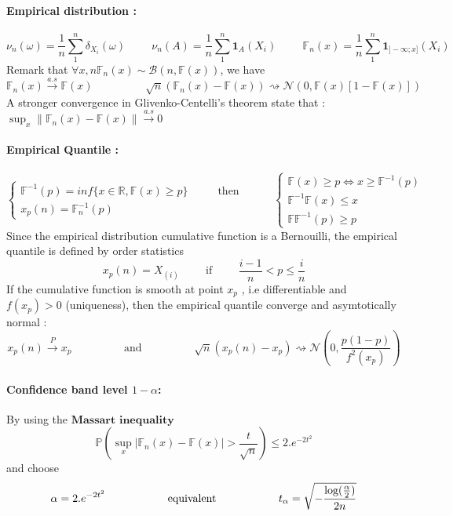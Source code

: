 \documentclass[a4paper,10pt]{article}
\begin{document}
\paragraph{Empirical distribution : }
\[
\nu_n(\omega) = \frac{1}{n}\sum^{n}_{1} \delta_{X_i}(\omega) 
\hspace{1cm} 
\nu_n(A) = \frac{1}{n} \sum^{n}_{1} \mathbf{1}_A(X_i)
\hspace{1cm} 
\mathbb{F}_n(x) = \frac{1}{n} \sum^{n}_{1} \mathbf{1}_{]-\infty;x]}(X_i) 
\]
Remark that $\forall x, n\mathbb{F}_n(x) \sim \mathcal{B}(n,\mathbb{F}(x) )$, we have
\[
\mathbb{F}_n(x) \xrightarrow{a.s}   \mathbb{F}(x)
\hspace{2cm} 
\sqrt{n}(\mathbb{F}_n(x) -  \mathbb{F}(x)) \rightsquigarrow   \mathcal{N}(0,\mathbb{F}(x)[1-\mathbb{F}(x)] )
\]
A stronger convergence in Glivenko-Centelli's theorem state that : $\sup_{x} \| \mathbb{F}_n(x) -  \mathbb{F}(x) \| \xrightarrow{a.s} 0$
\paragraph{Empirical Quantile : }
\[
\left\{
\begin{array}{l}
\mathbb{F}^{-1}(p) = inf \{ x \in \mathbb{R} , \mathbb{F}(x) \geq p \} \hspace{1cm} \text{ then } \\
x_p(n) = \mathbb{F}_n^{-1}(p)
\end{array}\right.
\hspace{1cm}
\left\{
\begin{array}{l}
 \mathbb{F}(x) \geq p \Longleftrightarrow x \geq \mathbb{F}^{-1}(p) \\
 \mathbb{F}^{-1}\mathbb{F}(x) \leq x   \\
 \mathbb{F}\mathbb{F}^{-1}(p) \geq p   
\end{array}\right. 
\]
Since the empirical distribution cumulative function is a Bernouilli, the empirical quantile is defined by order statistics
\[
x_p(n) = X_{(i)} \hspace{1cm} \text{if} \hspace{1cm} \frac{i-1}{n} < p \leq \frac{i}{n}
\]
If the cumulative function is smooth at point $x_p$ , i.e differentiable and $f(x_p)>0$ (uniqueness), then the empirical quantile converge and asymtotically normal :
\[
x_p(n) \xrightarrow{P} x_p 
\hspace{2cm} \text{and} \hspace{2cm} 
\sqrt{n}(x_p(n) - x_p ) \rightsquigarrow   \mathcal{N}(0,\frac{p(1-p)}{f^2(x_p)} )
\]
\paragraph{Confidence band level $1-\alpha$: }
By using the $\textbf{Massart inequality}$
\[
\mathbb{P}( \sup_{x} | \mathbb{F}_n(x) -  \mathbb{F}(x) | > \frac{t}{\sqrt{n}} ) \leq 2.e^{-2t^2}
\]
and choose 
\[
\alpha =  2.e^{-2t^2} \hspace{20mm} \text{equivalent} \hspace{20mm} t_{\alpha} = \sqrt{ -\frac{\text{log}(\frac{\alpha}{2})}{2n} }
\]
\end{document}
